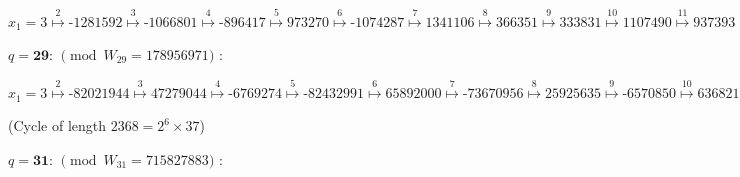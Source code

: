\documentclass[latin1]{quadrature}
\newcommand{\PMod}[1]{\!\!\pmod{#1}}
\newif\ifenfrancais
\begin{document}
\begin{article}
\begin{article}
$x_1 = 3
\stackrel{2}{\mapsto} \text{-1281592}
\stackrel{3}{\mapsto} \text{-1066801}
\stackrel{4}{\mapsto} \text{-896417}
\stackrel{5}{\mapsto} \text{973270}
\stackrel{6}{\mapsto} \text{-1074287}
\stackrel{7}{\mapsto} \text{1341106}
\stackrel{8}{\mapsto} \text{366351}
\stackrel{9}{\mapsto} \text{333831}
\stackrel{10}{\mapsto} \text{1107490}
\stackrel{11}{\mapsto} \text{937393}
\stackrel{12}{\mapsto} \text{907735}
\stackrel{13}{\mapsto} \text{-1298722}
\stackrel{14}{\mapsto} \text{-300994}
\stackrel{15}{\mapsto} \text{416316}
\stackrel{16}{\mapsto} \text{-572929}
\stackrel{17}{\mapsto} \text{1302116}
\stackrel{18}{\mapsto} \text{67769}
\stackrel{19}{\mapsto} \text{-1258056}
\stackrel{20}{\mapsto} \text{370787}
\stackrel{21}{\mapsto} \text{-4097}
\stackrel{22=q-1}{\mapsto} \text{-932068} = \textbf{-1/3}
\stackrel{}{\mapsto} \text{-1281592} = x_2 \dots $


\vspace{.1in}

$q=\textbf{29}$: $\PMod{W_{29}=178956971}$ :

$x_1 = 3
\stackrel{2}{\mapsto} \text{-82021944}
\stackrel{3}{\mapsto} \text{47279044}
\stackrel{4}{\mapsto} \text{-6769274}
\stackrel{5}{\mapsto} \text{-82432991}
\stackrel{6}{\mapsto} \text{65892000}
\stackrel{7}{\mapsto} \text{-73670956}
\stackrel{8}{\mapsto} \text{25925635}
\stackrel{9}{\mapsto} \text{-6570850}
\stackrel{10}{\mapsto} \text{63682155}
\stackrel{11}{\mapsto} \text{-19930570}
\stackrel{12}{\mapsto} \text{8768966}
\stackrel{13}{\mapsto} \text{-80742700}
\stackrel{14}{\mapsto} \text{-83486737}
\stackrel{15}{\mapsto} \text{60018973}
\stackrel{16}{\mapsto} \text{-89447744}
\stackrel{17}{\mapsto} \text{13157511}
\stackrel{18}{\mapsto} \text{-5229550}
\stackrel{19}{\mapsto} \text{-51905325}
\stackrel{20}{\mapsto} \text{-19198981}
\stackrel{21}{\mapsto} \text{-57252499}
\stackrel{22}{\mapsto} \text{22541219}
\stackrel{23}{\mapsto} \text{11253408}
\stackrel{24}{\mapsto} \text{-29629532}
\stackrel{25}{\mapsto} \text{77141064}
\stackrel{26}{\mapsto} \text{-89199707}
\stackrel{27}{\mapsto} \text{-49038102}
\stackrel{28=q-1}{\mapsto} \text{-16133813} \not = \textbf{-1/3} \  (=119304647)
\stackrel{29}{\mapsto} \dots
\stackrel{2370}{\mapsto} \text{28969859}
\stackrel{2371}{\mapsto} \text{47279044} = x_3$
\ifenfrancais
(Cycle de longueur $2368 = 2^6 \times 37$)
\else
(Cycle of length $2368 = 2^6 \times 37$)
\fi

\vspace{.1in}

$q=\textbf{31}$: $\PMod{W_{31}=715827883}$ :


\end{article}
\end{article}
\end{document}
